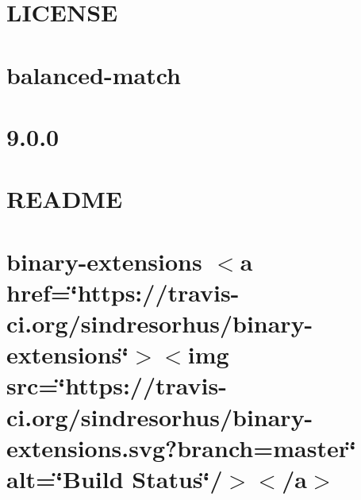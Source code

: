 \let\mypdfximage\pdfximage\def\pdfximage{\immediate\mypdfximage}\documentclass[twoside]{book}
\newcommand{\+}{\discretionary{\mbox{\scriptsize$\hookleftarrow$}}{}{}}
\begin{document}
\chapter{L\+I\+C\+E\+N\+SE}
\label{md__c_1__git_hub__p_r_o_y_e_c_t_o-_i_i_i-_g_o_t_rest-api-node-mysql_node_modules_balanced-match__l_i_c_e_n_s_e}

\chapter{balanced-\/match}
\label{md__c_1__git_hub__p_r_o_y_e_c_t_o-_i_i_i-_g_o_t_rest-api-node-mysql_node_modules_balanced-match__r_e_a_d_m_e}

\chapter{9.0.0}
\label{md__c_1__git_hub__p_r_o_y_e_c_t_o-_i_i_i-_g_o_t_rest-api-node-mysql_node_modules_bignumber_8js__c_h_a_n_g_e_l_o_g}

\chapter{R\+E\+A\+D\+ME}
\label{md__c_1__git_hub__p_r_o_y_e_c_t_o-_i_i_i-_g_o_t_rest-api-node-mysql_node_modules_bignumber_8js__r_e_a_d_m_e}

\chapter{binary-\/extensions $<$a href=\char`\"{}https\+://travis-\/ci.\+org/sindresorhus/binary-\/extensions\char`\"{}$>$$<$img src=\char`\"{}https\+://travis-\/ci.\+org/sindresorhus/binary-\/extensions.\+svg?branch=master\char`\"{} alt=\char`\"{}\+Build Status\char`\"{}/$>$$<$/a$>$}
\label{md__c_1__git_hub__p_r_o_y_e_c_t_o-_i_i_i-_g_o_t_rest-api-node-mysql_node_modules_binary-extensions_readme}

\end{document}
